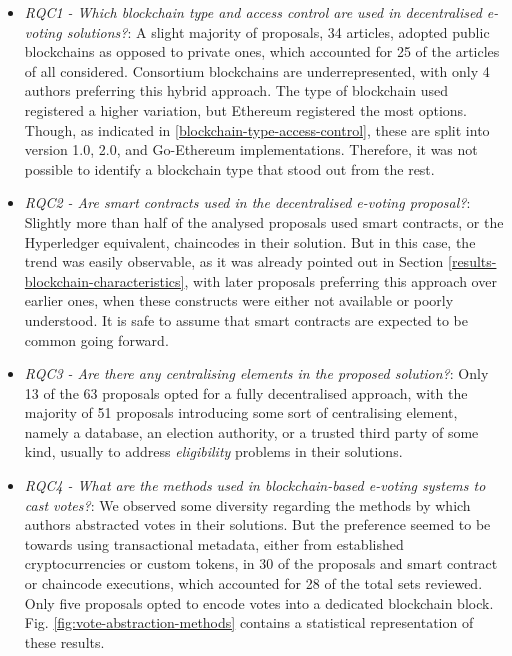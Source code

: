 \documentclass[../access.tex]{subfiles}
\begin{document}
	\begin{itemize}
        \item {\emph{RQC1 - Which blockchain type and access control are used in decentralised e-voting solutions?}: A slight majority of proposals, 34 articles, adopted public blockchains as opposed to private ones, which accounted for 25 of the articles of all considered. Consortium blockchains are underrepresented, with only 4 authors preferring this hybrid approach. The type of blockchain used registered a higher variation, but Ethereum registered the most options. Though, as indicated in \ref{blockchain-type-access-control}, these are split into version 1.0, 2.0, and Go-Ethereum implementations. Therefore, it was not possible to identify a blockchain type that stood out from the rest.}
        \item {\emph{RQC2 - Are smart contracts used in the decentralised e-voting proposal?}: Slightly more than half of the analysed proposals used smart contracts, or the Hyperledger equivalent, chaincodes in their solution. But in this case, the trend was easily observable, as it was already pointed out in Section \ref{results-blockchain-characteristics}, with later proposals preferring this approach over earlier ones, when these constructs were either not available or poorly understood. It is safe to assume that smart contracts are expected to be common going forward.}
        \item {\emph{RQC3 - Are there any centralising elements in the proposed solution?}: Only 13 of the 63 proposals opted for a fully decentralised approach, with the majority of 51 proposals introducing some sort of centralising element, namely a database, an election authority, or a trusted third party of some kind, usually to address \textit{eligibility} problems in their solutions.}
        \item {\emph{RQC4 - What are the methods used in blockchain-based e-voting systems to cast votes?}: We observed some diversity regarding the methods by which authors abstracted votes in their solutions. But the preference seemed to be towards using transactional metadata, either from established cryptocurrencies or custom tokens, in 30 of the proposals and smart contract or chaincode executions, which accounted for 28 of the total sets reviewed. Only five proposals opted to encode votes into a dedicated blockchain block.
        Fig. \ref{fig:vote-abstraction-methods} contains a statistical representation of these results.}
	\end{itemize}
\end{document}
